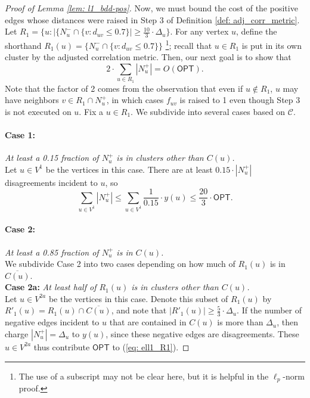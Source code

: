\documentclass[11pt]{article}
\begin{document}
\begin{proof}[Proof of Lemma \ref{lem: l1_bdd-pos}]
Now, we must bound the cost of the positive edges whose distances were raised in Step 3 of Definition \ref{def: adj_corr_metric}. 
Let $R_1 = \{u : \vert\{N_u^- \cap \{v: d_{uv} \leq 0.7\}\vert \geq \frac{10}{3}\cdot \Delta_u\}$.
For any vertex $u$, define the shorthand $R_1(u) = \{N_u^- \cap \{v: d_{uv} \leq 0.7\}\}$
\footnote{The use of a subscript may not be clear here, but it is helpful in the $\ell_p$-norm proof.}; 
recall that $u \in R_1$ is put in its own cluster by the adjusted correlation metric.
Then, our next goal is to show that
\begin{equation} \label{eq: ell1_R1}
2 \cdot \sum_{u \in R_1} |N_u^+| = O(\textsf{OPT}).
\end{equation}
Note that the factor of 2 comes from the observation that even if $u \not \in R_1$, $u$ may have neighbors $v \in R_1 \cap N_u^+$, in which cases $f_{uv}$ is raised to 1 even though Step 3 is not executed on $u$. Fix a $u \in R_1$.
We subdivide into several cases based on $\mathcal{C}$.

\paragraph{Case 1: }\emph{At least a 0.15 fraction of $N_u^+$ is in clusters other than $C(u)$.} \\
Let $ u \in V^{1}$ be the vertices in this case.
There are at least $0.15\cdot |N_u^+|$ disagreements incident to $u$, so 
$$\boxed{\sum_{u \in V^1} |N_u^+| \leq \sum_{u \in V^1} \frac{1}{0.15} \cdot y(u) \leq \frac{20}{3}\cdot \textsf{OPT}.}$$

\paragraph{Case 2: }\emph{At least a 0.85 fraction of $N_u^+$ is in $C(u)$.} \\
We subdivide Case 2 into two cases depending on how much 
of $R_1(u)$ is in $\overline{C(u)}$.\\

\noindent \textbf{Case 2a:} \emph{At least half of $R_1(u)$ is in clusters other than $C(u)$.} \\
Let $ u \in  V^{2a}$ be the vertices in this case.
Denote this subset of $R_1(u)$ by $R'_1(u) = R_1(u) \cap \overline{C(u)}$, and note that $|R'_1(u)| \geq \frac{5}{3}\cdot \Delta_u$. If the number of negative edges incident to $u$ that are contained in $C(u)$ is more than $\Delta_u$, then charge $|N_u^+| = \Delta_u$ to $y(u)$, since these negative edges are disagreements. These $u \in V^{2a}$ thus contribute $\textsf{OPT}$ to (\ref{eq: ell1_R1}). 


\end{proof}
\end{document}
